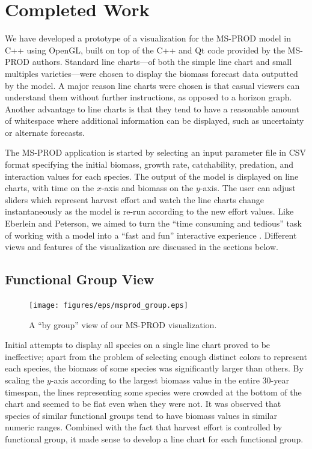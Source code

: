 \chapter{Completed Work}

We have developed a prototype of a visualization for the MS-PROD model in C++ using OpenGL, built on top of the C++ and Qt code provided by the MS-PROD authors.  Standard line charts---of both the simple line chart and small multiples varieties---were chosen to display the biomass forecast data outputted by the model.  A major reason line charts were chosen is that casual viewers can understand them without further instructions, as opposed to a horizon graph.  Another advantage to line charts is that they tend to have a reasonable amount of whitespace where additional information can be displayed, such as uncertainty or alternate forecasts.

The MS-PROD application is started by selecting an input parameter file in CSV format specifying the initial biomass, growth rate, catchability, predation, and interaction values for each species.  The output of the model is displayed on line charts, with time on the $x$-axis and biomass on the $y$-axis.  The user can adjust sliders which represent harvest effort and watch the line charts change instantaneously as the model is re-run according to the new effort values.  Like Eberlein and Peterson, we aimed to turn the ``time consuming and tedious'' task of working with a model into a ``fast and fun'' interactive experience \cite{eberlein1992}.  Different views and features of the visualization are discussed in the sections below.  

\section{Functional Group View}

\begin{figure}[h]
	\centering
	\texttt{[image: figures/eps/msprod\_group.eps]}
	\caption{A ``by group'' view of our MS-PROD visualization.}
	\label{fig:msprod_group}
\end{figure}

Initial attempts to display all species on a single line chart proved to be ineffective; apart from the problem of selecting enough distinct colors to represent each species, the biomass of some species was significantly larger than others.  By scaling the $y$-axis according to the largest biomass value in the entire 30-year timespan, the lines representing some species were crowded at the bottom of the chart and seemed to be flat even when they were not.  It was observed that species of similar functional groups tend to have biomass values in similar numeric ranges.  Combined with the fact that harvest effort is controlled by functional group, it made sense to develop a line chart for each functional group.

